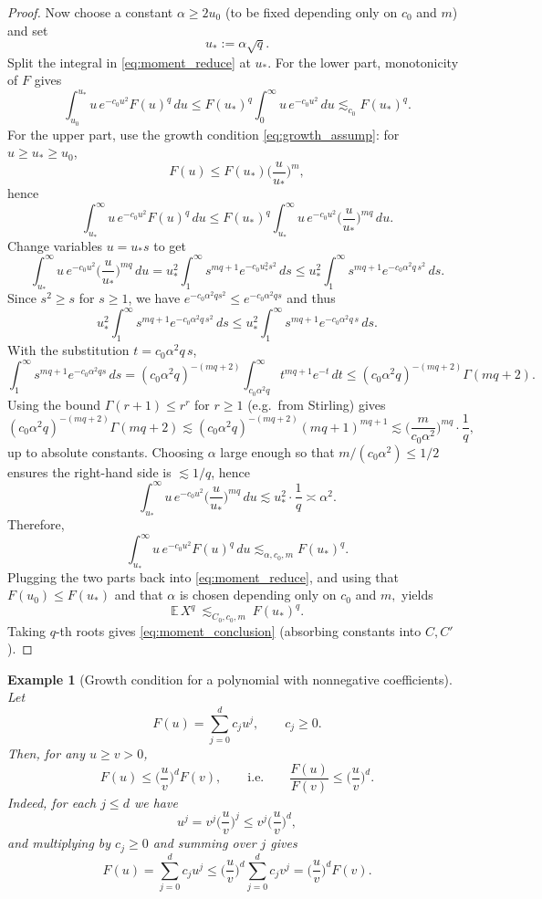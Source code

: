 \documentclass[numbers,webpdf,imaiai]{ima-authoring-template}
\theoremstyle{thmstyletwo}%
\newtheorem{example}{Example}%
\numberwithin{equation}{section}
\numberwithin{equation}{section}
\begin{document}
\begin{appendix}
\begin{proof}
Now choose a constant $\alpha\ge 2u_0$ (to be fixed depending only on $c_0$ and $m$) and set
\[
u_\ast:=\alpha\sqrt q.
\]
Split the integral in \eqref{eq:moment_reduce} at $u_\ast$.
For the lower part, monotonicity of $F$ gives
\[
\int_{u_0}^{u_\ast}u\,e^{-c_0u^2}F(u)^q\,du
\le F(u_\ast)^q\int_{0}^{\infty}u\,e^{-c_0u^2}\,du
\lesssim_{c_0} F(u_\ast)^q.
\]
For the upper part, use the growth condition \eqref{eq:growth_assump}:
for $u\ge u_\ast\ge u_0$,
\[
F(u)\le F(u_\ast)\Big(\frac{u}{u_\ast}\Big)^m,
\]
hence
\[
\int_{u_\ast}^{\infty}u\,e^{-c_0u^2}F(u)^q\,du
\le F(u_\ast)^q \int_{u_\ast}^{\infty}u\,e^{-c_0u^2}\Big(\frac{u}{u_\ast}\Big)^{mq}\,du.
\]
Change variables $u=u_\ast s$ to get
\[
\int_{u_\ast}^{\infty}u\,e^{-c_0u^2}\Big(\frac{u}{u_\ast}\Big)^{mq}\,du
= u_\ast^2\int_{1}^{\infty}s^{mq+1}e^{-c_0u_\ast^2 s^2}\,ds
\le u_\ast^2\int_{1}^{\infty}s^{mq+1}e^{-c_0\alpha^2 q\, s^2}\,ds.
\]
Since $s^2\ge s$ for $s\ge 1$, we have $e^{-c_0\alpha^2 q s^2}\le e^{-c_0\alpha^2 q s}$ and thus
\[
u_\ast^2\int_{1}^{\infty}s^{mq+1}e^{-c_0\alpha^2 q\, s^2}\,ds
\le u_\ast^2\int_{1}^{\infty}s^{mq+1}e^{-c_0\alpha^2 q\, s}\,ds.
\]
With the substitution $t=c_0\alpha^2 q\,s$,
\[
\int_{1}^{\infty}s^{mq+1}e^{-c_0\alpha^2 q s}\,ds
= (c_0\alpha^2 q)^{-(mq+2)}\int_{c_0\alpha^2 q}^{\infty} t^{mq+1}e^{-t}\,dt
\le (c_0\alpha^2 q)^{-(mq+2)}\Gamma(mq+2).
\]
Using the bound $\Gamma(r+1)\le r^r$ for $r\ge 1$ (e.g.\ from Stirling) gives
\[
(c_0\alpha^2 q)^{-(mq+2)}\Gamma(mq+2)
\lesssim (c_0\alpha^2 q)^{-(mq+2)}(mq+1)^{mq+1}
\lesssim \Big(\frac{m}{c_0\alpha^2}\Big)^{mq}\cdot \frac{1}{q},
\]
up to absolute constants. Choosing $\alpha$ large enough so that
$m/(c_0\alpha^2)\le 1/2$ ensures the right-hand side is $\lesssim 1/q$, hence
\[
\int_{u_\ast}^{\infty}u\,e^{-c_0u^2}\Big(\frac{u}{u_\ast}\Big)^{mq}\,du
\lesssim u_\ast^2\cdot \frac{1}{q}
\asymp \alpha^2.
\]
Therefore,
\[
\int_{u_\ast}^{\infty}u\,e^{-c_0u^2}F(u)^q\,du \lesssim_{\alpha,c_0,m} F(u_\ast)^q.
\]
Plugging the two parts back into \eqref{eq:moment_reduce}, and using that $F(u_0)\le F(u_\ast)$ and that $\alpha$ is chosen depending only on $c_0$ and $m,$ yields
\[
\mathbb E\, X^q \ \lesssim_{C_0,c_0,m}\ F(u_\ast)^q.
\]
Taking $q$-th roots gives \eqref{eq:moment_conclusion} (absorbing constants into $C,C'$).
\end{proof}

\begin{example}[Growth condition for a polynomial with nonnegative coefficients]\label{ex:growth_positive_poly}
Let
\[
F(u)=\sum_{j=0}^{d} c_j u^j,\qquad c_j\ge 0.
\]
Then, for any $u\ge v>0$,
\[
F(u)\le \Big(\frac{u}{v}\Big)^d F(v),
\qquad\text{i.e.}\qquad
\frac{F(u)}{F(v)}\le \Big(\frac{u}{v}\Big)^d.
\]
Indeed, for each $j\le d$ we have
\[
u^j=v^j\Big(\frac{u}{v}\Big)^j\le v^j\Big(\frac{u}{v}\Big)^d,
\]
and multiplying by $c_j\ge 0$ and summing over $j$ gives
\[
F(u)=\sum_{j=0}^d c_j u^j
\le \Big(\frac{u}{v}\Big)^d \sum_{j=0}^d c_j v^j
=\Big(\frac{u}{v}\Big)^d F(v).
\]
\end{example}




\end{appendix}
\end{document}
